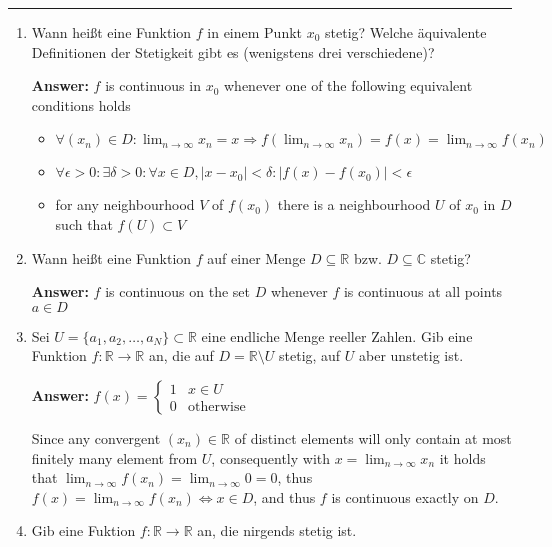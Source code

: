 \documentclass[11pt]{article}
\begin{document}


\medskip\hrule
\begin{enumerate}

\item Wann heißt eine Funktion $f$ in einem Punkt $x_0$ stetig? Welche äquivalente Definitionen der Stetigkeit gibt es (wenigstens drei verschiedene)?

\textbf{Answer:} $f$ is continuous in $x_0$ whenever one of the following equivalent conditions holds
\begin{itemize}
    \item $\forall (x_n) \in D\colon \lim_{n\to\infty}{x_n} = x \Rightarrow f(\lim_{n\to\infty}{x_n}) = f(x) = \lim_{n\to\infty}{f(x_n)}$
    \item $\forall \epsilon > 0\colon \exists \delta > 0\colon \forall x \in D, | x - x_0| < \delta\colon |f(x) - f(x_0)| < \epsilon$
    \item for any neighbourhood $V$ of $f(x_0)$ there is a neighbourhood $U$ of $x_0$ in $D$ such that $f(U) \subset V$
\end{itemize}

\item Wann heißt eine Funktion $f$ auf einer Menge $D \subseteq \mathbb{R}$ bzw. $D \subseteq \mathbb{C}$ stetig?

\textbf{Answer:} $f$ is continuous on the set $D$ whenever $f$ is continuous at all points $a \in D$

\item Sei $U = \{a_1, a_2, \dots, a_N \} \subset \mathbb{R}$ eine endliche Menge reeller Zahlen. Gib eine Funktion
$f\colon \mathbb{R} \to \mathbb{R}$ an, die auf $D = \mathbb{R} \setminus U$ stetig, auf $U$ aber unstetig ist.

\textbf{Answer:} $f(x) = \begin{cases}
    1& x \in U\\
    0&\text{otherwise}
\end{cases}$

Since any convergent $(x_n) \in \mathbb{R}$ of distinct elements will only contain at most finitely many element from $U$, consequently with $x = \lim_{n \to \infty} x_n$ it holds that $\lim_{n \to \infty} f(x_n) = \lim_{n \to \infty} 0 = 0$, thus $f(x) = \lim_{n \to \infty} f(x_n) \Leftrightarrow x \in D$, and thus $f$ is continuous exactly on $D$.

\item Gib eine Fuktion $f\colon \mathbb{R} \to \mathbb{R}$ an, die nirgends stetig ist.


\end{enumerate}
\end{document}
